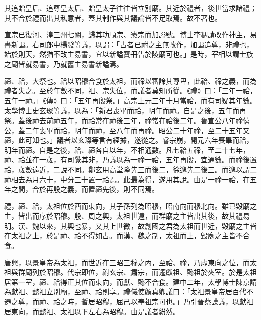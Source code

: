 \begin{pinyinscope}
 其追贈皇后、追尊皇太后、贈皇太子往往皆立別廟。其近於禮者，後世當求諸禮；其不合於禮而出其私意者，蓋其制作與其議論皆不足取焉。故不著也。



 宣宗已復河、湟三州七關，歸其功順宗、憲宗而加謚號。博士李稠請改作神主，易書新謚。右司郎中楊發等議，以謂：「古者已祔之主無改作，加謚追尊，非禮也，始於則天，然猶不改主易書，宜以新謚寶冊告於陵廟可也。」是時，宰相以謂士族之廟皆就易書，乃就舊主易書新謚焉。



 禘、祫，大祭也。祫以昭穆合食於太祖，而禘以審諦其尊卑，此祫、禘之義，而為禮者失之。至於年數不同，祖、宗失位，而議者莫知所從。《禮》曰：「三年一祫，五年一禘。」《傳》曰：「五年再殷祭。」高宗上元三年十月當祫，而有司疑其年數。太學博士史玄璨等議，以為：「新君喪畢而祫，明年而禘。自是之後，五年而再祭。蓋後禘去前禘五年，而祫常在禘後三年，禘常在祫後二年。魯宣公八年禘僖公，蓋二年喪畢而祫，明年而禘，至八年而再禘。昭公二十年禘，至二十五年又禘，此可知也。」議者以玄璨等言有經據，遂從之。睿宗崩，開元六年喪畢而祫，明年而禘。自是之後，祫、禘各自以年，不相通數。凡七祫五禘，至二十七年，禘、祫並在一歲，有司覺其非，乃議以為一禘一祫，五年再殷，宜通數。而禘後置祫，歲數遠近，二說不同。鄭玄用高堂隆先三而後二，徐邈先二後三。而邈以謂二禘相去為月六十，中分三十置一祫焉。此最為得，遂用其說。由是一禘一祫，在五年之間，合於再殷之義，而置禘先後，則不同焉。



 禮，禘、祫，太祖位於西而東向，其子孫列為昭穆，昭南向而穆北向。雖已毀廟之主，皆出而序於昭穆。殷、周之興，太祖世遠，而群廟之主皆出其後，故其禮易明。漢、魏以來，其興也暴，又其上世微，故創國之君為太祖而世近，毀廟之主皆在太祖之上，於是禘、祫不得如古。而漢、魏之制，太祖而上，毀廟之主皆不合食。



 唐興，以景皇帝為太祖，而世近在三昭三穆之內，至祫、禘，乃虛東向之位，而太祖與群廟列於昭穆。代宗即位，祔玄宗、肅宗，而遷獻祖、懿祖於夾室。於是太祖居第一室，禘、祫得正其位而東向，而獻、懿不合食。建中二年，太學博士陳京請為獻祖、懿祖立別廟，至禘、祫則享。禮儀使顏真卿議曰：「太祖景皇帝居百代不遷之尊，而禘、祫之時，暫居昭穆，屈己以奉祖宗可也。」乃引晉蔡謨議，以獻祖居東向，而懿祖、太祖以下左右為昭穆。由是議者紛然。




\end{pinyinscope}
